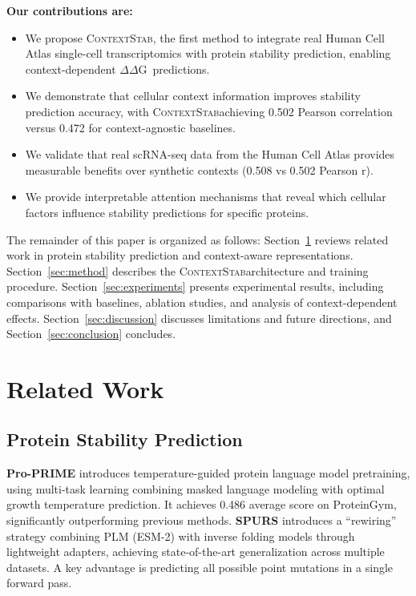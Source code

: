 \documentclass{article}
\newcommand{\ddg}{$\Delta\Delta$G}
\newcommand{\contextstab}{\textsc{ContextStab}}
\begin{document}
\textbf{Our contributions are:}
\begin{itemize}
    \item We propose \contextstab, the first method to integrate real Human Cell Atlas single-cell transcriptomics with protein stability prediction, enabling context-dependent \ddg\ predictions.
    \item We demonstrate that cellular context information improves stability prediction accuracy, with \contextstab achieving 0.502 Pearson correlation versus 0.472 for context-agnostic baselines.
    \item We validate that real scRNA-seq data from the Human Cell Atlas provides measurable benefits over synthetic contexts (0.508 vs 0.502 Pearson r).
    \item We provide interpretable attention mechanisms that reveal which cellular factors influence stability predictions for specific proteins.
\end{itemize}

The remainder of this paper is organized as follows: Section~\ref{sec:related} reviews related work in protein stability prediction and context-aware representations. Section~\ref{sec:method} describes the \contextstab architecture and training procedure. Section~\ref{sec:experiments} presents experimental results, including comparisons with baselines, ablation studies, and analysis of context-dependent effects. Section~\ref{sec:discussion} discusses limitations and future directions, and Section~\ref{sec:conclusion} concludes.

\section{Related Work}
\label{sec:related}

\subsection{Protein Stability Prediction}

\textbf{Pro-PRIME} \citep{hong2024proprime} introduces temperature-guided protein language model pretraining, using multi-task learning combining masked language modeling with optimal growth temperature prediction. It achieves 0.486 average score on ProteinGym, significantly outperforming previous methods. \textbf{SPURS} \citep{li2025generalizable} introduces a ``rewiring'' strategy combining PLM (ESM-2) with inverse folding models through lightweight adapters, achieving state-of-the-art generalization across multiple datasets. A key advantage is predicting all possible point mutations in a single forward pass.
\end{document}
